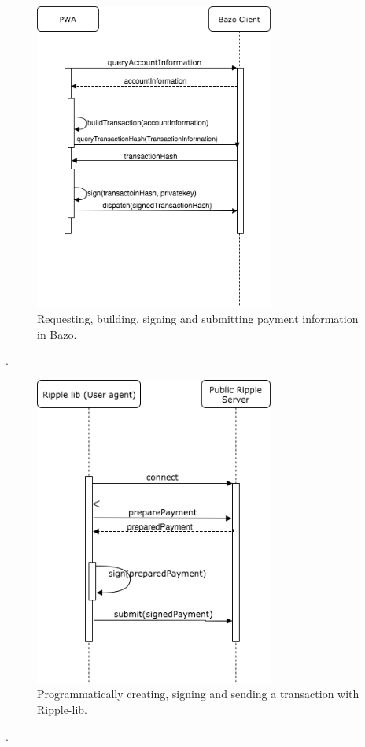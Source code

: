 \begin{figure}
\centering
\includegraphics[width=0.7\textwidth]{diagrams/transactionProcess.png}
\caption{\label{fig:TransactionProcess}Requesting, building, signing and submitting payment information in Bazo.}
\end{figure}.

\begin{figure}
\centering
\includegraphics[width=0.7\textwidth]{diagrams/ripplelibSendTX.png}
\caption{\label{fig:ripplesendTx}Programmatically creating, signing and sending a transaction with Ripple-lib\cite{ripplelib}.}
\end{figure}.


